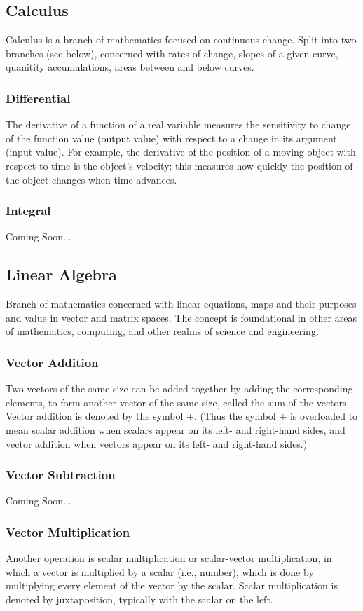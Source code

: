 \documentclass[12pt, letterpaper]{article}
\begin{document}
\begin{sloppypar}
\begin{flushleft}
\subsection{Calculus}
Calculus is a branch of mathematics focused on continuous change. Split into two branches
(see below), concerned with rates of change, slopes of a given curve, quanitity accumulations,
areas between and below curves.

\subsubsection{Differential} 
The derivative of a function of a real variable measures the sensitivity to change of the 
function value (output value) with respect to a change in its argument (input value). For 
example, the derivative of the position of a moving object with respect to time is the 
object's velocity: this measures how quickly the position of the object changes when time 
advances.
\subsubsection{Integral}
Coming Soon...

\subsection{Linear Algebra}
Branch of mathematics concerned with linear equations, maps and their purposes and value 
in vector and matrix spaces. The concept is foundational in other areas of mathematics, 
computing, and other realms of science and engineering. 

\subsubsection{Vector Addition}
Two vectors of the same size can be added together by adding the corresponding elements, to 
form another vector of the same size, called the sum of the vectors. Vector addition is 
denoted by the symbol +. (Thus the symbol + is overloaded to mean scalar addition when 
scalars appear on its left- and right-hand sides, and vector addition when vectors appear 
on its left- and right-hand sides.)

\subsubsection{Vector Subtraction}
Coming Soon...

\subsubsection{Vector Multiplication}
Another operation is scalar multiplication or scalar-vector multiplication, in which a vector 
is multiplied by a scalar (i.e., number), which is done by multiplying every element of the 
vector by the scalar. Scalar multiplication is denoted by juxtaposition, typically with the 
scalar on the left.


\end{flushleft}
\end{sloppypar}
\end{document}
